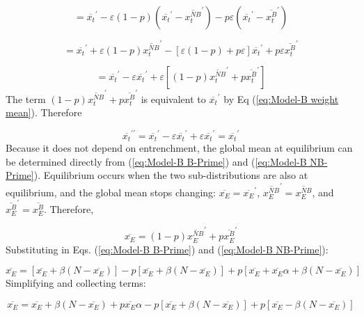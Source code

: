 \begin{equation}
=\overline{x_{t}}^{\prime}-\varepsilon(1-p)(\overline{x_{t}}^{\prime}-\overline{x_{t}^{NB}}^{\prime})-p\varepsilon(\overline{x_{t}}^{\prime}-\overline{x_{t}^{B}}^{\prime})
\end{equation}

\begin{equation}
=\overline{x_{t}}^{\prime}+\varepsilon(1-p)\overline{x_{t}^{NB}}^{\prime}-[\varepsilon(1-p)+p\varepsilon]\overline{x_{t}}^{\prime}+p\varepsilon\overline{x_{t}^{B}}^{\prime}
\end{equation}

\begin{equation}
=\overline{x_{t}}^{\prime}-\varepsilon\overline{x_{t}}^{\prime}+\varepsilon[(1-p)\overline{x_{t}^{NB}}^{\prime}+p\overline{x_{t}^{B}}^{\prime}]
\end{equation}
The term $(1-p)\overline{x_{t}^{NB}}^{\prime}+p\overline{x_{t}^{B}}^{\prime}$
is equivalent to $\overline{x_{t}}^{\prime}$ by Eq (\ref{eq:Model-B weight mean}).
Therefore

\begin{equation}
\overline{x_{t}}^{\prime\prime}=\overline{x_{t}}^{\prime}-\varepsilon\overline{x_{t}}^{\prime}+\varepsilon\overline{x_{t}}^{\prime}=\overline{x_{t}}^{\prime}
\end{equation}
Because it does not depend on entrenchment, the global mean at equilibrium
can be determined directly from (\ref{eq:Model-B B-Prime}) and (\ref{eq:Model-B NB-Prime}).
Equilibrium occurs when the two sub-distributions are also at equilibrium,
and the global mean stops changing: $\overline{x_{E}}=\overline{x_{E}}^{\prime}$,
$\overline{x_{E}^{NB}}^{\prime}=\overline{x_{E}^{NB}}$, and $\overline{x_{E}^{B}}^{\prime}=\overline{x_{E}^{B}}$.
Therefore,

\begin{equation}
\overline{x_{E}}=(1-p)\overline{x_{E}^{NB}}^{\prime}+p\overline{x_{E}^{B}}^{\prime}
\end{equation}
Substituting in Eqs. (\ref{eq:Model-B B-Prime}) and (\ref{eq:Model-B NB-Prime}):

\begin{equation}
\overline{x_{E}}=[\overline{x_{E}}+\beta(N-\overline{x_{E}})]-p[\overline{x_{E}}+\beta(N-\overline{x_{E}})]+p[\overline{x_{E}}+\overline{x_{E}}\alpha+\beta(N-\overline{x_{E}})]
\end{equation}
Simplifying and collecting terms:

\begin{equation}
\overline{x_{E}}=\overline{x_{E}}+\beta(N-\overline{x_{E}})+p\overline{x_{E}}\alpha-p[\overline{x_{E}}+\beta(N-\overline{x_{E}})]+p[\overline{x_{E}}-\beta(N-\overline{x_{E}})]
\end{equation}


